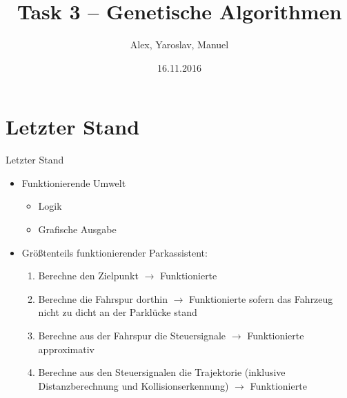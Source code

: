 \documentclass[12pt]{beamer}
\title{Task 3 -- Genetische Algorithmen}
\institute{EvoTest}
\author{Alex, Yaroslav, Manuel}
\date{16.11.2016}
\begin{document}
\maketitle 

\section{Letzter Stand}
\begin{frame}{Letzter Stand}
\begin{itemize}
	\item Funktionierende Umwelt
	\begin{itemize}
		\item Logik
		\item Grafische Ausgabe
	\end{itemize}
	\item Größtenteils funktionierender Parkassistent:
	\begin{enumerate}
		\item Berechne den Zielpunkt $\rightarrow$ Funktionierte
		\item Berechne die Fahrspur dorthin $\rightarrow$ Funktionierte sofern das Fahrzeug nicht zu dicht an der Parklücke stand
		\item Berechne aus der Fahrspur die Steuersignale $\rightarrow$ Funktionierte approximativ
		\item Berechne aus den Steuersignalen die Trajektorie (inklusive Distanzberechnung und Kollisionserkennung) $\rightarrow$ Funktionierte
	\end{enumerate}
\end{itemize}
\end{frame}
\end{document}
